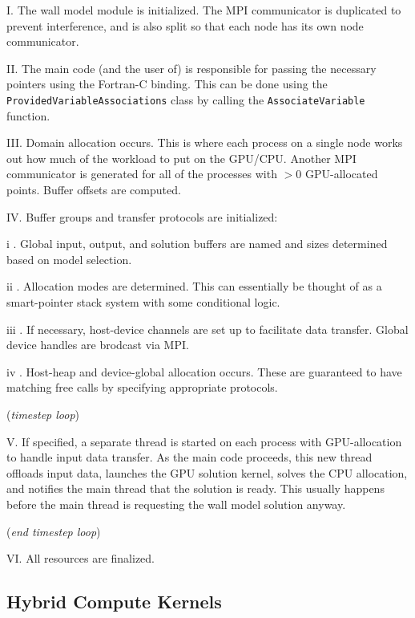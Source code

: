 \documentclass[10pt]{article}
\renewcommand{\sec}[1]{\subsection*{#1}}
\begin{document}
	\ilist
	{
		\item [\textsc{I}.] The wall model module is initialized. The MPI communicator is duplicated to prevent interference, and is also split so that each node
			has its own node communicator.
		\item [\textsc{II}.] The main code (and the user of) is responsible for passing the necessary pointers using the Fortran-C binding. This can be done using the \texttt{ProvidedVariableAssociations} class by calling
			the \texttt{AssociateVariable} function.
		\item [\textsc{III}.] Domain allocation occurs. This is where each process on a single node works out how much of the workload to put on the GPU/CPU. Another MPI communicator
			is generated for all of the processes with $> 0$ GPU-allocated points. Buffer offsets are computed.
		\item [\textsc{IV}.] Buffer groups and transfer protocols are initialized:
		\ilist
		{
			\item [i]. Global input, output, and solution buffers are named and sizes determined based on model selection.
			\item [ii]. Allocation modes are determined. This can essentially be thought of as a smart-pointer stack system with some conditional logic.
			\item [iii]. If necessary, host-device channels are set up to facilitate data transfer. Global device handles are brodcast via MPI.
			\item [iv]. Host-heap and device-global allocation occurs. These are guaranteed to have matching free calls by specifying appropriate protocols.
		}

		(\textit{timestep loop})

		\item [\textsc{V}.] If specified, a separate thread is started on each process with GPU-allocation to handle input data transfer. As the main code proceeds, this new thread
			offloads input data, launches the GPU solution kernel, solves the CPU allocation, and notifies the main thread that the solution is ready. This usually happens before the main
			thread is requesting the wall model solution anyway.

		(\textit{end timestep loop})

		\item [\textsc{VI}.] All resources are finalized.
	}

	\sec{Hybrid Compute Kernels}
\end{document}
